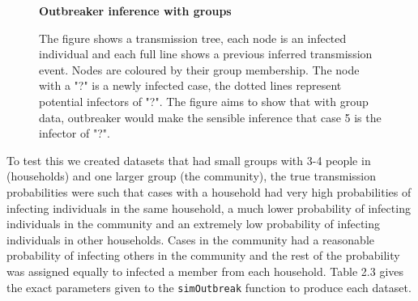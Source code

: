 \documentclass[11pt,a4paper]{report}
\begin{document}
\begin{figure}[h!]
\centering
{\bf Outbreaker inference with groups}
\caption{The figure shows a transmission tree, each node is an infected individual and each full line shows a previous inferred transmission event. Nodes are coloured by their group membership. The node with a "?" is a newly infected case, the dotted lines represent potential infectors of "?". The figure aims to show that with group data, outbreaker would make the sensible inference that case 5 is the infector of "?".}
\end{figure}
To test this we created datasets that had small groups with 3-4 people in (households) and one larger group (the community), the true transmission probabilities were such that cases with a household had very high probabilities of infecting individuals in the same household, a much lower probability of infecting individuals in the community and an extremely low probability of infecting individuals in other households. Cases in the community had a reasonable probability of infecting others in the community and the rest of the probability was assigned equally to infected a member from each household. Table 2.3 gives the exact parameters given to the {\tt simOutbreak} function to produce each dataset.
\end{document}

